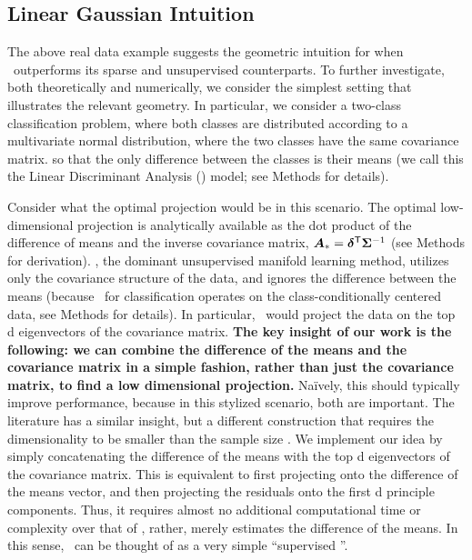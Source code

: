 \documentclass[10pt]{article}
\begin{document}
\subsection*{Linear Gaussian Intuition}

The above real data example suggests the geometric intuition for when \Lol~outperforms its sparse and unsupervised counterparts.  To further investigate, both theoretically and numerically, we consider the simplest setting that illustrates the relevant geometry.  In particular, we consider a two-class classification problem, where both classes are distributed according to a multivariate normal distribution, where the two classes have the same covariance matrix. so that the only difference between the classes is their means (we call this the Linear Discriminant Analysis (\Lda) model; see Methods for details).




Consider what the optimal projection would be in this scenario. The optimal low-dimensional projection is analytically available as the dot product of the difference of means and the inverse covariance matrix, $\boldsymbol{A}_*=\boldsymbol{\delta}^{\mathsf{T}} \boldsymbol{\Sigma}^{-1}$ \cite{Bickel2004a} (see Methods for derivation).
\Pca, the dominant unsupervised manifold learning method, utilizes only the covariance structure of the data, and ignores the difference between the means (because \Pca~for classification operates on the class-conditionally centered data, see Methods for details).
In particular, \Pca~would project the data on the top d eigenvectors of the  covariance matrix.
\textbf{The key insight of our work is the following: we can combine the difference of the means and the covariance matrix in a simple fashion, rather than just the covariance matrix, to find a low dimensional projection.}
Na\"ively, this should typically improve performance, because in this stylized scenario, both are important. The  literature has a similar insight, but a different construction that requires the dimensionality to be smaller than the sample size \cite{Li1991a, Tishby1999a, Globerson2003a, Cook2005a,Fukumizu2004a}. We implement our idea by simply concatenating the difference of the means with the top d eigenvectors of the  covariance matrix.
This is equivalent to first projecting onto the difference of the means vector, and then projecting the residuals onto the first d principle components.
Thus, it requires almost no additional computational time or complexity over that of \Pca, rather, merely estimates the difference of the means.
In this sense, \Lol~can be thought of as a very simple  ``supervised \Pca''.
\end{document}
